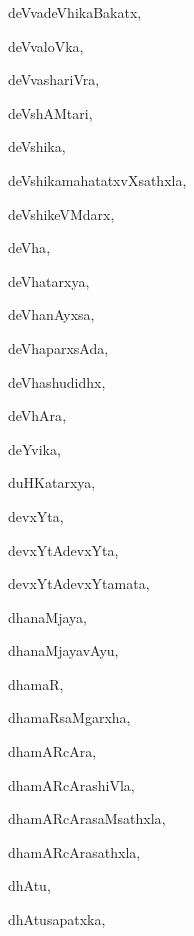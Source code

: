 \begin{multicols}{3}
{\noindent
{deVvadeVhikaBakatx}, \pageref{deVvadeVhikaBakatx}

\noindent
{deVvaloVka}, \pageref{deVvaloVka}

\noindent
{deVvashariVra}, \pageref{deVvashariVra}

\noindent
{deVshAMtari}, \pageref{deVshAMtari}

\noindent
{deVshika}, \pageref{deVshika}

\noindent
{deVshikamahatatxvXsathxla}, \pageref{deVshikamahatatxvXsathxla}

\noindent
{deVshikeVMdarx}, \pageref{deVshikeVMdarx}

\noindent
{deVha}, \pageref{deVha}

\noindent
{deVhatarxya}, \pageref{deVhatarxya}

\noindent
{deVhanAyxsa}, \pageref{deVhanAyxsa}

\noindent
{deVhaparxsAda}, \pageref{deVhaparxsAda}

\noindent
{deVhashudidhx}, \pageref{deVhashudidhx}

\noindent
{deVhAra}, \pageref{deVhAra}

\noindent
{deYvika}, \pageref{deYvika}

\noindent
{duHKatarxya}, \pageref{duHKatarxya}

\noindent
{devxYta}, \pageref{devxYta}

\noindent
{devxYtAdevxYta}, \pageref{devxYtAdevxYta}

\noindent
{devxYtAdevxYtamata}, \pageref{devxYtAdevxYtamata}

\bigskip
\noindent
{}
\smallskip

\noindent
{dhanaMjaya}, \pageref{dhanaMjaya}

\noindent
{dhanaMjayavAyu}, \pageref{dhanaMjayavAyu}

\noindent
{dhamaR}, \pageref{dhamaR}

\noindent
{dhamaRsaMgarxha}, \pageref{dhamaRsaMgarxha}

\noindent
{dhamARcAra}, \pageref{dhamARcAra}

\noindent
{dhamARcArashiVla}, \pageref{dhamARcArashiVla}

\noindent
{dhamARcArasaMsathxla}, \pageref{dhamARcArasaMsathxla}

\noindent
{dhamARcArasathxla}, \pageref{dhamARcArasathxla}

\noindent
{dhAtu}, \pageref{dhAtu}

\noindent
{dhAtusapatxka}, \pageref{dhAtusapatxka}

}
\end{multicols}
